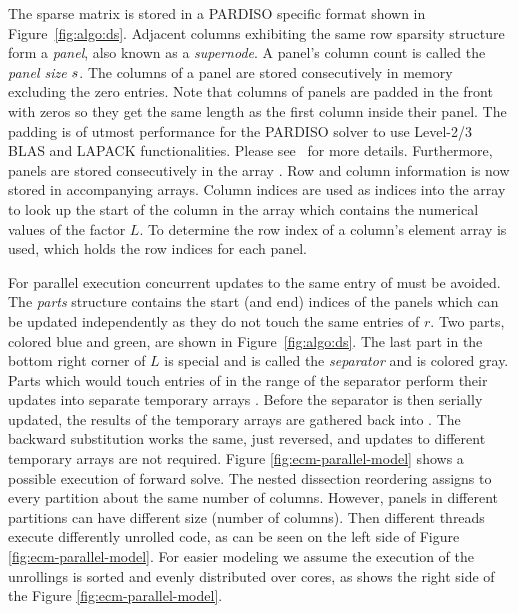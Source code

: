 The sparse matrix is stored in a PARDISO specific format shown in
Figure~\ref{fig:algo:ds}.
Adjacent columns exhibiting the same row sparsity structure form a
\textit{panel}, also known as a \textit{supernode}.
A panel's column count is called the \textit{panel size} $s$.
The columns of a panel are stored consecutively in memory excluding the zero
entries. 
Note that columns of panels are padded in the front with zeros so they get the 
same length as the first column inside their panel. 
The padding is of utmost performance for the PARDISO solver to use Level-2/3
BLAS and LAPACK functionalities. Please see~\cite{Bollhofer2020} for more
details.
Furthermore, panels are stored consecutively in the array \vlnz{}.
Row and column information is now stored in accompanying arrays.
Column indices are used as indices into the array \vxlnz{} to look up the
start of
the column in the array \vlnz{} which contains the numerical values of the factor $L$.
To determine the row index of a column's element array \vindx{} is
used, which holds the row indices for each panel.

For parallel execution concurrent updates to the same entry of \vr{} must be
avoided.
The \textit{parts} structure contains the start (and end) indices of the panels
which can be updated independently as they do not touch the same entries of $r$.
Two parts, colored blue and green, are shown in Figure~\ref{fig:algo:ds}.
The last part in the bottom right corner of $L$ is special and is called the 
\textit{separator} and is colored gray.
%
Parts which would touch entries of \vr{} in the range of the separator perform 
their updates into separate temporary arrays \vtemp{}.
Before the separator is then serially updated, the results of the temporary
arrays are gathered back into \vr{}. 
The backward substitution works the same, just reversed, and
updates to different temporary arrays are not required.
{\color{blue} Figure \ref{fig:ecm-parallel-model} shows a possible execution of forward solve. The nested dissection reordering assigns to every partition about the same number of columns. However, panels in different partitions can have different size (number of columns). Then different threads execute differently unrolled code, as can be seen on the left side of Figure \ref{fig:ecm-parallel-model}. For easier modeling we assume the execution of the unrollings is sorted and evenly distributed over cores, as shows the right side of the Figure \ref{fig:ecm-parallel-model}.}

